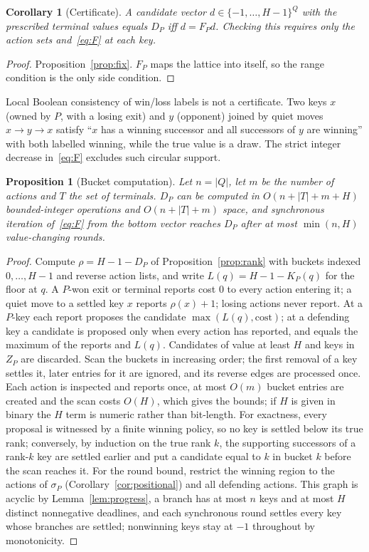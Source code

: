 \documentclass[journal]{IEEEtran}
\newtheorem{corollary}{Corollary}
\newtheorem{proposition}{Proposition}
\theoremstyle{definition}
\theoremstyle{remark}
\begin{document}
\begin{corollary}[Certificate]\label{cor:cert}
A candidate vector $d\in\{-1,\dots,H-1\}^Q$ with the prescribed terminal values equals $D_P$ iff $d=F_Pd$. Checking this requires only the action sets and~\eqref{eq:F} at each key.
\end{corollary}
\begin{proof}
Proposition~\ref{prop:fix}. $F_P$ maps the lattice into itself, so the range condition is the only side condition.
\end{proof}

Local Boolean consistency of win/loss labels is not a certificate. Two keys $x$ (owned by $P$, with a losing exit) and $y$ (opponent) joined by quiet moves $x\to y\to x$ satisfy ``$x$ has a winning successor and all successors of $y$ are winning'' with both labelled winning, while the true value is a draw. The strict integer decrease in~\eqref{eq:F} excludes such circular support.

\begin{proposition}[Bucket computation]\label{prop:bucket}
Let $n=|Q|$, let $m$ be the number of actions and $T$ the set of terminals. $D_P$ can be computed in $O(n+|T|+m+H)$ bounded-integer operations and $O(n+|T|+m)$ space, and synchronous iteration of~\eqref{eq:F} from the bottom vector reaches $D_P$ after at most $\min(n,H)$ value-changing rounds.
\end{proposition}
\begin{proof}
Compute $\rho=H-1-D_P$ of Proposition~\ref{prop:rank} with buckets indexed $0,\dots,H-1$ and reverse action lists, and write $L(q)=H-1-K_P(q)$ for the floor at $q$. A $P$-won exit or terminal reports cost $0$ to every action entering it; a quiet move to a settled key $x$ reports $\rho(x)+1$; losing actions never report. At a $P$-key each report proposes the candidate $\max(L(q),\text{cost})$; at a defending key a candidate is proposed only when every action has reported, and equals the maximum of the reports and $L(q)$. Candidates of value at least $H$ and keys in $Z_P$ are discarded. Scan the buckets in increasing order; the first removal of a key settles it, later entries for it are ignored, and its reverse edges are processed once. Each action is inspected and reports once, at most $O(m)$ bucket entries are created and the scan costs $O(H)$, which gives the bounds; if $H$ is given in binary the $H$ term is numeric rather than bit-length. For exactness, every proposal is witnessed by a finite winning policy, so no key is settled below its true rank; conversely, by induction on the true rank $k$, the supporting successors of a rank-$k$ key are settled earlier and put a candidate equal to $k$ in bucket $k$ before the scan reaches it. For the round bound, restrict the winning region to the actions of $\sigma_P$ (Corollary~\ref{cor:positional}) and all defending actions. This graph is acyclic by Lemma~\ref{lem:progress}, a branch has at most $n$ keys and at most $H$ distinct nonnegative deadlines, and each synchronous round settles every key whose branches are settled; nonwinning keys stay at $-1$ throughout by monotonicity.
\end{proof}
\end{document}
